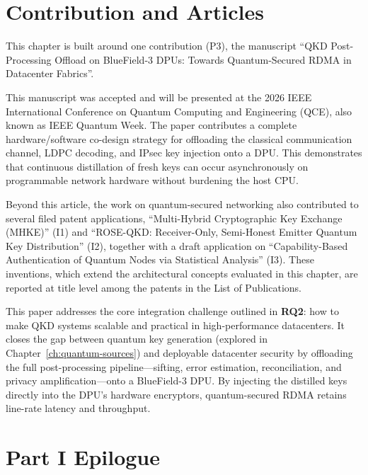 \section{Contribution and Articles}
\label{sec:qkd-dpu-context}

This chapter is built around one contribution (P3), the manuscript \enquote{QKD Post-Processing Offload on BlueField-3 DPUs: Towards Quantum-Secured RDMA in Datacenter Fabrics}.

This manuscript was accepted and will be presented at the 2026 IEEE International Conference on Quantum Computing and Engineering (QCE), also known as IEEE Quantum Week. The paper contributes a complete hardware/software co-design strategy for offloading the classical communication channel, LDPC decoding, and IPsec key injection onto a DPU. This demonstrates that continuous distillation of fresh keys can occur asynchronously on programmable network hardware without burdening the host CPU.

Beyond this article, the work on quantum-secured networking also contributed to several filed patent applications, \enquote{Multi-Hybrid Cryptographic Key Exchange (MHKE)} (I1) and \enquote{ROSE-QKD: Receiver-Only, Semi-Honest Emitter Quantum Key Distribution} (I2), together with a draft application on \enquote{Capability-Based Authentication of Quantum Nodes via Statistical Analysis} (I3). These inventions, which extend the architectural concepts evaluated in this chapter, are reported at title level among the patents in the List of Publications.

This paper addresses the core integration challenge outlined in \textbf{RQ2}: how to make QKD systems scalable and practical in high-performance datacenters. It closes the gap between quantum key generation (explored in Chapter~\ref{ch:quantum-sources}) and deployable datacenter security by offloading the full post-processing pipeline---sifting, error estimation, reconciliation, and privacy amplification---onto a BlueField-3 DPU. By injecting the distilled keys directly into the DPU's hardware encryptors, quantum-secured RDMA retains line-rate latency and throughput.


\section{Part I Epilogue}

